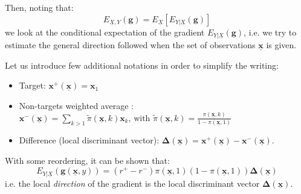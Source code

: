 \documentclass[conference]{IEEEtran}
\begin{document}
Then, noting that:
$$E_{\underline{X},Y}(\boldsymbol{g}) = E_{\underline{X}}\left[E_{Y|\underline{X}}(\boldsymbol{g})\right]$$
we look at the conditional expectation of the gradient
$E_{Y|\underline{X}}(\boldsymbol{g})$,
i.e. we try to estimate the general direction followed when
the set of observations $\underline{\mathbf{x}}$ is given.

Let us introduce few additional notations in order to simplify the writing:
\begin{itemize}
 \item Target: 
    $\boldsymbol{x}^+(\underline{\mathbf{x}}) = \boldsymbol{x}_1 $
 \item Non-targets weighted average : 
    $\boldsymbol{x}^-(\underline{\mathbf{x}}) = \sum_{k>1} \tilde{\pi}(\underline{\mathbf{x}},k) \boldsymbol{x}_k
    \mbox{, with } 
    \tilde{\pi}(\underline{\mathbf{x}},k)=\frac{\pi(\underline{\mathbf{x}},k)}{1 - \pi(\underline{\mathbf{x}},1)}$
 \item Difference (local discriminant vector):
    $\boldsymbol{\Delta}(\underline{\mathbf{x}}) = \boldsymbol{x}^+(\underline{\mathbf{x}}) - \boldsymbol{x}^-(\underline{\mathbf{x}})$. 
\end{itemize}

With some reordering, it can be shown that: %
\begin{equation}\label{eq:exp_up}
E_{Y|\underline{X}}(\boldsymbol{g}(\underline{\mathbf{x}},y)) = (r^+-r^-) \pi(\underline{\mathbf{x}},1) (1 - \pi(\underline{\mathbf{x}},1)) \boldsymbol{\Delta}(\underline{\mathbf{x}})
\end{equation}
i.e. the local \emph{direction} of the gradient 
is the local discriminant vector $\boldsymbol{\Delta}(\underline{\mathbf{x}})$. 
\end{document}
